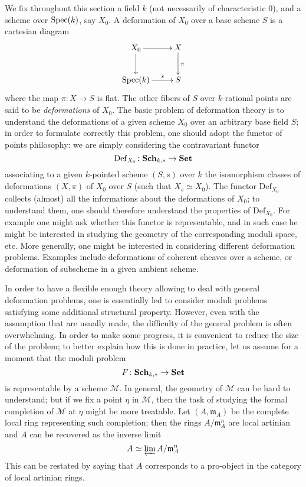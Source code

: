 \begin{refsection}
We fix throughout this section a field $k$ (not necessarily of characteristic $0$), and a scheme over $\mathrm{Spec}(k)$, say $X_0$. A deformation of $X_0$ over a base scheme $S$ is a cartesian diagram
\[
\xymatrix{
X_0 \ar[d] \ar[r] & X \ar[d]^\pi \\ \spec(k) \ar[r]^-{s} & S
}
\]
where the map $\pi \colon X \to S$ is flat. The other fibers of $S$ over $k$-rational points are said to be \emph{deformations} of $X_0$. The basic problem of deformation theory is to understand the deformations of a given scheme $X_0$ over an arbitrary base field $S$; in order to formulate correctly this problem, one should adopt the functor of points philosophy: we are simply considering the contravariant functor
\[
\mathrm{Def}_{X_0} \colon \mathbf{Sch}_{k,*} \to \mathbf{Set}
\]
associating to a given $k$-pointed scheme $(S,s)$ over $k$ the isomorphism classes of deformations $(X,\pi)$ of $X_0$ over $S$ (such that $X_s \simeq X_0$). The functor $\mathrm{Def}_{X_0}$ collects (almost) all the informations about the deformations of $X_0$; to understand them, one should therefore understand the properties of $\mathrm{Def}_{X_0}$. For example one might ask whether this functor is representable, and in such case he might be interested in studying the geometry of the corresponding moduli space, etc. More generally, one might be interested in considering different deformation problems. Examples include deformations of coherent sheaves over a scheme, or deformation of subscheme in a given ambient scheme.

In order to have a flexible enough theory allowing to deal with general deformation problems, one is essentially led to consider moduli problems satisfying some additional structural property. However, even with the assumption that are usually made, the difficulty of the general problem is often overwhelming. In order to make some progress, it is convenient to reduce the size of the problem; to better explain how this is done in practice, let us assume for a moment that the moduli problem
\[
F \colon \mathbf{Sch}_{k,*} \to \mathbf{Set}
\]
is representable by a scheme $\mathcal M$. In general, the geometry of $\mathcal M$ can be hard to understand; but if we fix a point $\eta$ in $\mathcal M$, then the task of studying the formal completion of $\mathcal M$ at $\eta$ might be more treatable. Let $(A,\mathfrak m_A)$ be the complete local ring representing such completion; then the rings $A / \mathfrak m_A^n$ are local artinian and $A$ can be recovered as the inverse limit
\[
A \simeq \varprojlim A / \mathfrak m_A^n
\]
This can be restated by saying that $A$ corresponds to a pro-object in the category of local artinian rings.


\end{refsection}
